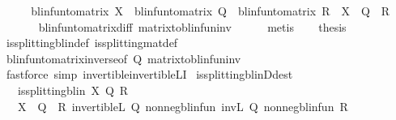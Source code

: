 \begin{isabellebody}
%
\isadelimproof
%
\endisadelimproof
%
\isatagproof
{}\isamarkupfalse%
\ {\isacharminus}{\kern0pt}\isanewline
\ \ \isamarkupfalse%
\ {\isachardoublequoteopen}blinfun{\isacharunderscore}{\kern0pt}to{\isacharunderscore}{\kern0pt}matrix\ X\ {\isacharequal}{\kern0pt}\ blinfun{\isacharunderscore}{\kern0pt}to{\isacharunderscore}{\kern0pt}matrix\ Q\ {\isacharminus}{\kern0pt}\ blinfun{\isacharunderscore}{\kern0pt}to{\isacharunderscore}{\kern0pt}matrix\ R\ {\isasymlongleftrightarrow}\ X\ {\isacharequal}{\kern0pt}\ Q\ {\isacharminus}{\kern0pt}\ R{\isachardoublequoteclose}\isanewline
\ \ \ \ \isamarkupfalse%
\ \ blinfun{\isacharunderscore}{\kern0pt}to{\isacharunderscore}{\kern0pt}matrix{\isacharunderscore}{\kern0pt}diff\ matrix{\isacharunderscore}{\kern0pt}to{\isacharunderscore}{\kern0pt}blinfun{\isacharunderscore}{\kern0pt}inv\isanewline
\ \ \ \ \isamarkupfalse%
\ metis\isanewline
\ \ \isamarkupfalse%
\ {\isacharquery}{\kern0pt}thesis\isanewline
\ \ \ \ \isamarkupfalse%
\ is{\isacharunderscore}{\kern0pt}splitting{\isacharunderscore}{\kern0pt}blin{\isacharunderscore}{\kern0pt}def\ is{\isacharunderscore}{\kern0pt}splitting{\isacharunderscore}{\kern0pt}mat{\isacharunderscore}{\kern0pt}def\isanewline
\ \ \ \ \isamarkupfalse%
\ blinfun{\isacharunderscore}{\kern0pt}to{\isacharunderscore}{\kern0pt}matrix{\isacharunderscore}{\kern0pt}inverse{\isacharbrackleft}{\kern0pt}of\ Q{\isacharbrackright}{\kern0pt}\ matrix{\isacharunderscore}{\kern0pt}to{\isacharunderscore}{\kern0pt}blinfun{\isacharunderscore}{\kern0pt}inv\isanewline
\ \ \ \ \isamarkupfalse%
\ {\isacharparenleft}{\kern0pt}fastforce\ simp{\isacharcolon}{\kern0pt}\ invertible{\isacharunderscore}{\kern0pt}invertible\isactrlsub L{\isacharunderscore}{\kern0pt}I{\isacharparenleft}{\kern0pt}{}{\isacharparenright}{\kern0pt}{\isacharparenright}{\kern0pt}\isanewline
{}\isamarkupfalse%
%
\endisatagproof
{\isafoldproof}%
%
\isadelimproof
\isanewline
%
\endisadelimproof
\isanewline
{}\isamarkupfalse%
\ is{\isacharunderscore}{\kern0pt}splitting{\isacharunderscore}{\kern0pt}blinD{\isacharbrackleft}{\kern0pt}dest{\isacharbrackright}{\kern0pt}{\isacharcolon}{\kern0pt}\ \isanewline
\ \ \ {\isachardoublequoteopen}is{\isacharunderscore}{\kern0pt}splitting{\isacharunderscore}{\kern0pt}blin\ X\ Q\ R{\isachardoublequoteclose}\isanewline
\ \ \ {\isachardoublequoteopen}X\ {\isacharequal}{\kern0pt}\ Q\ {\isacharminus}{\kern0pt}\ R{\isachardoublequoteclose}\ {\isachardoublequoteopen}invertible\isactrlsub L\ Q{\isachardoublequoteclose}\ {\isachardoublequoteopen}nonneg{\isacharunderscore}{\kern0pt}blinfun\ {\isacharparenleft}{\kern0pt}inv\isactrlsub L\ Q{\isacharparenright}{\kern0pt}{\isachardoublequoteclose}\ {\isachardoublequoteopen}nonneg{\isacharunderscore}{\kern0pt}blinfun\ R{\isachardoublequoteclose}\isanewline

\end{isabellebody}

